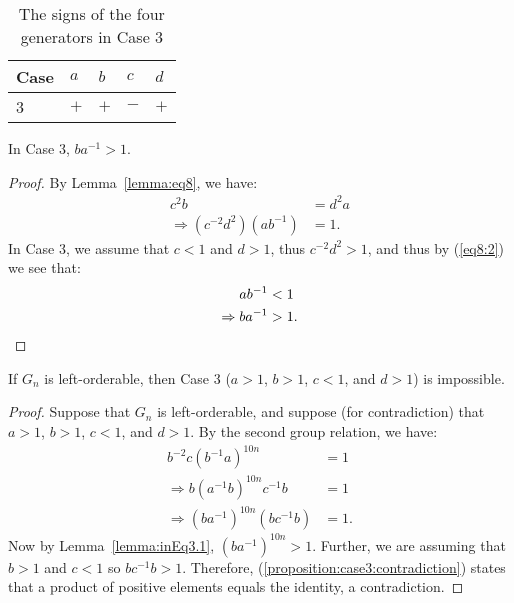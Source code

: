 \begin{table}[ht]
\begin{center}
\begin{tabular}{l | l | l | l | l}
Case\hspace{10 pt} & $a$\hspace{10 pt} & $b$\hspace{10 pt} & $c$\hspace{10 pt} & $d$\hspace{10 pt} \\\hline\hline
3 & $+$ & $+$ & $-$ & $+$ 
\end{tabular}
\end{center}
\caption{The signs of the four generators in Case 3}
\label{table:case3}
\end{table}

\begin{lemma} In Case 3, $ba^{-1}>1$.
\label{lemma:inEq3.1}
\end{lemma}
\begin{proof}By Lemma~\ref{lemma:eq8}, we have:
\begin{align}
c^{2}b&=d^{2}a\nonumber{}\\
\Rightarrow{}(c^{-2}d^{2})(ab^{-1})&=1.\label{eq8:2}
\end{align}
In Case 3, we assume that $c<1$ and $d>1$, thus $c^{-2}d^{2}>1$, and thus by (\ref{eq8:2}) we see that:
\begin{align*}
ab^{-1}&<1\\
\Rightarrow{}ba^{-1}&>1.\qedhere
\end{align*}
\end{proof}

\begin{proposition}
If $G_n$ is left-orderable, then Case 3 ($a>1$, $b>1$, $c<1$, and $d>1$) is impossible.
\end{proposition}
\begin{proof}Suppose that $G_n$ is left-orderable, and suppose (for contradiction) that $a>1$, $b>1$, $c<1$, and $d>1$. By the second group relation, we have:
\begin{align}
b^{-2}c(b^{-1}a)^{10n}&=1\nonumber{}\\
\Rightarrow{}b(a^{-1}b)^{10n}c^{-1}b&=1\nonumber{}\\
\Rightarrow{}(ba^{-1})^{10n}(bc^{-1}b)&=1.\label{proposition:case3:contradiction}
\end{align}
Now by Lemma~\ref{lemma:inEq3.1}, $(ba^{-1})^{10n}>1$. Further, we are assuming that $b>1$ and $c<1$ so $bc^{-1}b>1$. Therefore, (\ref{proposition:case3:contradiction}) states that a product of positive elements equals the identity, a contradiction.
\end{proof}

